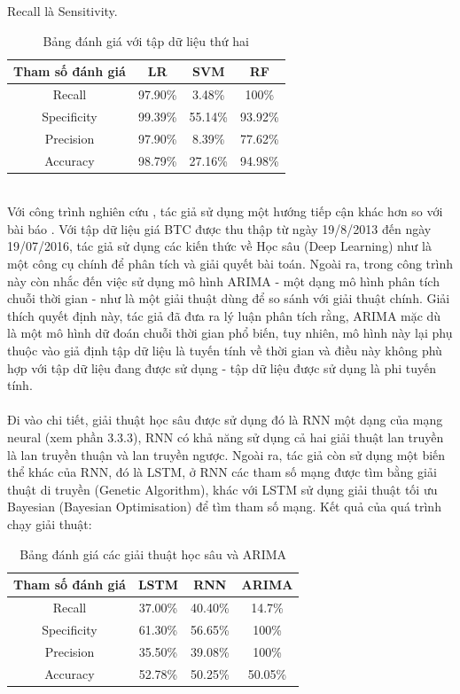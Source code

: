 Recall là Sensitivity.
\begin{table}[h]
\centering
\begin{tabular}{ |c|c|c|c| }
\hline
Tham số đánh giá & LR & SVM & RF \\
\hline
Recall & 97.90\% & 3.48\% & 100\% \\
\hline
Specificity & 99.39\% & 55.14\% & 93.92\% \\
\hline
Precision & 97.90\% & 8.39\% & 77.62\% \\
\hline
Accuracy & 98.79\% & 27.16\% & 94.98\% \\
\hline
\end{tabular}
\caption{Bảng đánh giá với tập dữ liệu thứ hai}
\end{table}\\
Với công trình nghiên cứu \cite{PredictingThePriceOfBitcoin}, tác giả sử dụng 
một hướng tiếp cận khác hơn so với bài báo \cite{AutomatedBitcoinTrading}. Với 
tập dữ liệu giá BTC được thu thập từ ngày 19/8/2013 đến ngày 19/07/2016, tác 
giả sử dụng các kiến thức về Học sâu (Deep Learning) như là một công cụ chính 
để phân tích và giải quyết bài toán. Ngoài ra, trong công trình này còn nhắc 
đến việc sử dụng mô hình ARIMA - một dạng mô hình phân tích chuỗi thời gian - 
như là một giải thuật dùng để so sánh với giải thuật chính. Giải thích quyết 
định này, tác giả đã đưa ra lý luận phân tích rằng, ARIMA mặc dù là một mô hình 
dữ đoán chuỗi thời gian phổ biến, tuy nhiên, mô hình này lại phụ thuộc vào giả 
định tập dữ liệu là tuyến tính về thời gian và điều này không phù hợp với tập 
dữ liệu đang được sử dụng - tập dữ liệu được sử dụng là phi tuyến tính.\\\\
Đi vào chi tiết, giải thuật học sâu được sử dụng đó là RNN một dạng của 
mạng neural (xem phần 3.3.3), RNN có khả năng sử dụng cả hai giải thuật lan 
truyền là lan truyền thuận và lan truyền ngược. Ngoài ra, tác giả còn sử dụng 
một biến thể khác của RNN, đó là LSTM, ở RNN các tham số mạng được tìm bằng 
giải thuật di truyền (Genetic Algorithm), khác với LSTM sử dụng giải thuật tối 
ưu Bayesian (Bayesian Optimisation) để tìm tham số mạng. Kết quả của quá trình 
chạy giải thuật:
\begin{table}[h]
\centering
\begin{tabular}{ |c|c|c|c| }
\hline
Tham số đánh giá & LSTM & RNN & ARIMA \\
\hline
Recall & 37.00\% & 40.40\% & 14.7\% \\
\hline
Specificity & 61.30\% & 56.65\% & 100\% \\
\hline
Precision & 35.50\% & 39.08\% & 100\% \\
\hline
Accuracy & 52.78\% & 50.25\% & 50.05\% \\
\hline
\end{tabular}
\caption{Bảng đánh giá các giải thuật học sâu và ARIMA}
\end{table}\\
